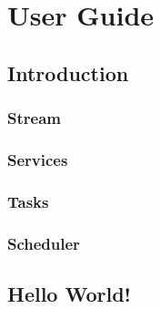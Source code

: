 \chapter{User Guide}

\section{Introduction}

\subsection{Stream}
\subsection{Services}
\subsection{Tasks}
\subsection{Scheduler}

\section{Hello World!}